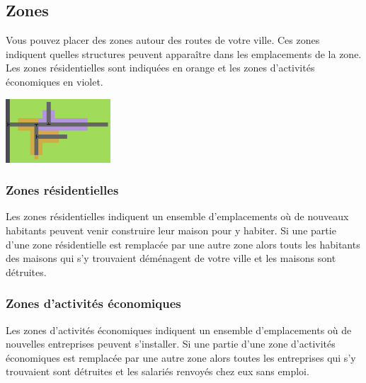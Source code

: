 \documentclass[11pt]{report}
\begin{document}
\subsection{Zones}
\begin{center}
	\begin{minipage}{0.6\textwidth}
		Vous pouvez placer des zones autour des routes de votre ville. Ces zones indiquent quelles structures peuvent apparaître dans les emplacements de la zone. Les zones résidentielles sont indiquées en orange et les zones d'activités économiques en violet.
	\end{minipage}
	\begin{minipage}{0.35\textwidth}
		\begin{flushright}
			\includegraphics[height=90px]{zones}
		\end{flushright}
	\end{minipage}
\end{center}

\subsubsection{Zones résidentielles}
Les zones résidentielles indiquent un ensemble d'emplacements où de nouveaux habitants peuvent venir construire leur maison pour y habiter. Si une partie d'une zone résidentielle est remplacée par une autre zone alors touts les habitants des maisons qui s'y trouvaient déménagent de votre ville et les maisons sont détruites.

\subsubsection{Zones d'activités économiques}
Les zones d'activités économiques indiquent un ensemble d'emplacements où de nouvelles entreprises peuvent s'installer. Si une partie d'une zone d'activités économiques est remplacée par une autre zone alors toutes les entreprises qui s'y trouvaient sont détruites et les salariés renvoyés chez eux sans emploi.
\end{document}

